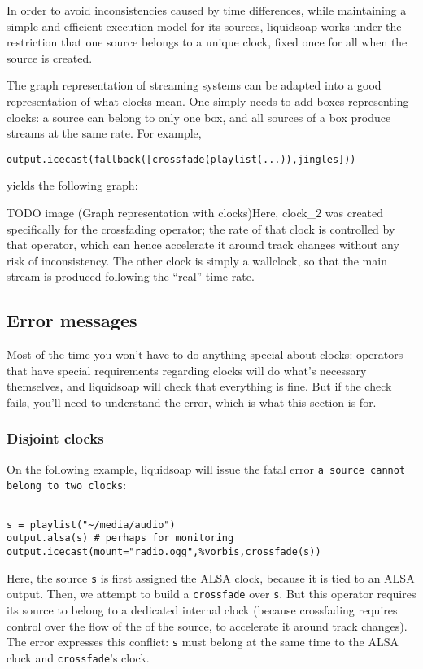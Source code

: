 In order to avoid inconsistencies caused by time differences,
while maintaining a simple and efficient execution model for
its sources, liquidsoap works under the restriction that
one source belongs to a unique clock,
fixed once for all when the source is created.

The graph representation of streaming systems can be adapted
into a good representation of what clocks mean.
One simply needs to add boxes representing clocks:
a source can belong to only one box,
and all sources of a box produce streams at the same rate.
For example, 
\begin{verbatim}
output.icecast(fallback([crossfade(playlist(...)),jingles]))
\end{verbatim}

yields the following graph:

TODO image (Graph representation with clocks)Here, clock\_2 was created specifically for the crossfading
operator; the rate of that clock is controlled by that operator,
which can hence accelerate it around track changes without any
risk of inconsistency.
The other clock is simply a wallclock, so that the main stream
is produced following the ``real'' time rate.

\subsection{Error messages}
Most of the time you won't have to do anything special about clocks:
operators that have special requirements regarding clocks will do
what's necessary themselves, and liquidsoap will check that everything is 
fine. But if the check fails, you'll need to understand the error,
which is what this section is for.

\subsubsection{Disjoint clocks}
On the following example, liquidsoap will issue the fatal error
\verb+a source cannot belong to two clocks+:

\begin{verbatim}

s = playlist("~/media/audio")
output.alsa(s) # perhaps for monitoring
output.icecast(mount="radio.ogg",%vorbis,crossfade(s))
\end{verbatim}
Here, the source \verb+s+ is first assigned the ALSA clock,
because it is tied to an ALSA output.
Then, we attempt to build a \verb+crossfade+ over \verb+s+.
But this operator requires its source to belong to a dedicated
internal clock (because crossfading requires control over the flow
of the of the source, to accelerate it around track changes).
The error expresses this conflict:
\verb+s+ must belong at the same time to the ALSA clock
and \verb+crossfade+'s clock.

